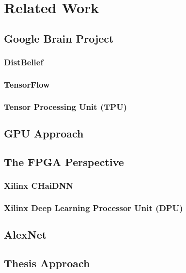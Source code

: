 \chapter{Related Work}

\label{Chapter-Related-Work}

\section{Google Brain Project}
\subsection{DistBelief}
\subsection{TensorFlow}
\subsection{Tensor Processing Unit (TPU)}

\section{GPU Approach}

\section{The FPGA Perspective}
\subsection{Xilinx CHaiDNN}
\subsection{Xilinx Deep Learning Processor Unit (DPU)}

\section{AlexNet}
\section{Thesis Approach}
